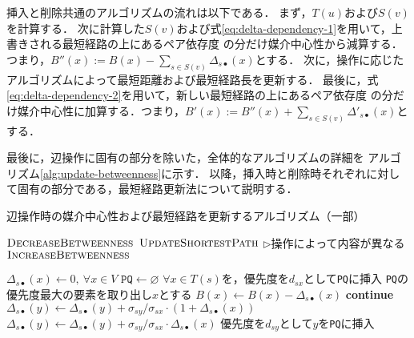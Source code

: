 挿入と削除共通のアルゴリズムの流れは以下である．
まず，$T(u)$および$S(v)$を計算する．
次に計算した$S(v)$および式\eqref{eq:delta-dependency-1}を用いて，上書きされる最短経路の上にあるペア依存度
の分だけ媒介中心性から減算する．つまり，$B''(x):=B(x)-\sum_{s\in S(v)}\Delta_{s\bullet}(x)$とする．
次に，操作に応じたアルゴリズムによって最短距離および最短経路長を更新する．
最後に，式\eqref{eq:delta-dependency-2}を用いて，新しい最短経路の上にあるペア依存度
の分だけ媒介中心性に加算する．つまり，$B'(x):=B''(x)+\sum_{s\in S(v)}\Delta'_{s\bullet}(x)$とする．

最後に，辺操作に固有の部分を除いた，全体的なアルゴリズムの詳細を
アルゴリズム\ref{alg:update-betweenness}に示す．
以降，挿入時と削除時それぞれに対して固有の部分である，最短経路更新法について説明する．

\begin{algorithm}[tbp]
  \caption{辺操作時の媒介中心性および最短経路を更新するアルゴリズム（一部）}
  \label{alg:update-betweenness}
  \begin{algorithmic}[1]\small
    \State $\textproc{DecreaseBetweenness}$
    \State $\textproc{UpdateShortestPath}$
    \hspace{.3cm}$\triangleright$操作によって内容が異なる
    \State $\textproc{IncreaseBetweenness}$
    \EndProcedure
  \end{algorithmic}
  \vspace{-.5cm}
  \begin{multicols}{2}
    \begin{algorithmic}[1]\small
      \makeatletter
      \setcounter{ALG@line}{5}
      \makeatother
      \State $\Delta_{s\bullet}(x)\gets0,\:\forall x\in V$
      \State $\texttt{PQ}\gets\varnothing$
      \State $\forall x\in T(s)$を，優先度を$d_{sx}$として\texttt{PQ}に挿入
      \State \texttt{PQ}の優先度最大の要素を取り出し$x$とする
      \State $B(x)\gets B(x)-\Delta_{s\bullet}(x)$
      \State \textbf{continue}
      \EndIf
      \State $\Delta_{s\bullet}(y)\gets\Delta_{s\bullet}(y)+\sigma_{sy}/\sigma_{sx}\cdot(1+\Delta_{s\bullet}(x))$
      \Else
      \State $\Delta_{s\bullet}(y)\gets\Delta_{s\bullet}(y)+\sigma_{sy}/\sigma_{sx}\cdot\Delta_{s\bullet}(x)$
      \EndIf
      \State 優先度を$d_{sy}$として$y$を\texttt{PQ}に挿入
      \EndIf
      \EndFor
      \EndWhile

\end{algorithmic}
\end{multicols}
\end{algorithm}
